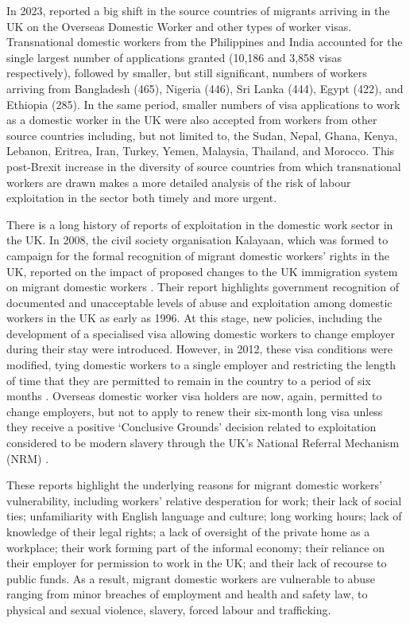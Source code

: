 \documentclass[
  12pt,
  letterpaper,
  DIV=11,
  numbers=noendperiod]{scrartcl}
\theoremstyle{plain}
\theoremstyle{definition}
\begin{document}
In 2023, \textcite{strauss_britain_2023} reported a big shift in the
source countries of migrants arriving in the UK on the Overseas Domestic
Worker and other types of worker visas. Transnational domestic workers
from the Philippines and India accounted for the single largest number
of applications granted (10,186 and 3,858 visas respectively), followed
by smaller, but still significant, numbers of workers arriving from
Bangladesh (465), Nigeria (446), Sri Lanka (444), Egypt (422), and
Ethiopia (285). In the same period, smaller numbers of visa applications
to work as a domestic worker in the UK were also accepted from workers
from other source countries including, but not limited to, the Sudan,
Nepal, Ghana, Kenya, Lebanon, Eritrea, Iran, Turkey, Yemen, Malaysia,
Thailand, and Morocco. This post-Brexit increase in the diversity of
source countries from which transnational workers are drawn makes a more
detailed analysis of the risk of labour exploitation in the sector both
timely and more urgent.

There is a long history of reports of exploitation in the domestic work
sector in the UK. In 2008, the civil society organisation Kalayaan,
which was formed to campaign for the formal recognition of migrant
domestic workers' rights in the UK, reported on the impact of proposed
changes to the UK immigration system on migrant domestic workers
\autocite{kalayaan_new_2008}. Their report highlights government
recognition of documented and unacceptable levels of abuse and
exploitation among domestic workers in the UK as early as 1996. At this
stage, new policies, including the development of a specialised visa
allowing domestic workers to change employer during their stay were
introduced. However, in 2012, these visa conditions were modified, tying
domestic workers to a single employer and restricting the length of time
that they are permitted to remain in the country to a period of six
months \autocite{gower_calls_2016}. Overseas domestic worker visa
holders are now, again, permitted to change employers, but not to apply
to renew their six-month long visa unless they receive a positive
`Conclusive Grounds' decision related to exploitation considered to be
modern slavery through the UK's National Referral Mechanism (NRM)
\autocite{romero_blueprint_2025}.

These reports highlight the underlying reasons for migrant domestic
workers' vulnerability, including workers' relative desperation for
work; their lack of social ties; unfamiliarity with English language and
culture; long working hours; lack of knowledge of their legal rights; a
lack of oversight of the private home as a workplace; their work forming
part of the informal economy; their reliance on their employer for
permission to work in the UK; and their lack of recourse to public
funds. As a result, migrant domestic workers are vulnerable to abuse
ranging from minor breaches of employment and health and safety law, to
physical and sexual violence, slavery, forced labour and trafficking.
\end{document}
